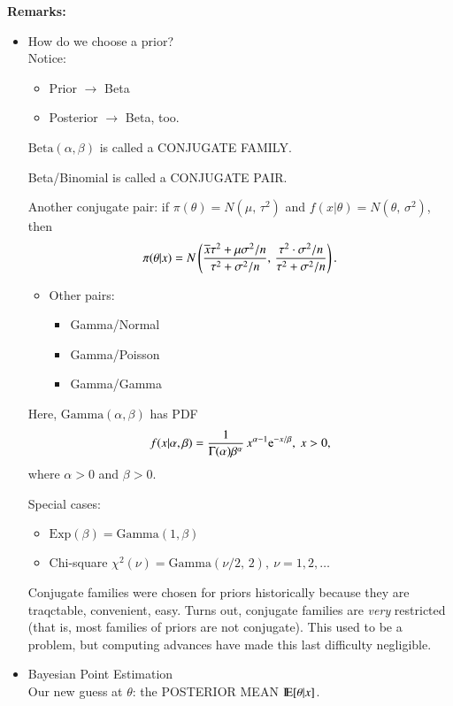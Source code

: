 \documentclass[captions=tableheading]{scrbook}
\begin{document}
\textbf{Remarks:}
\begin{itemize}

\item How do we choose a prior?\\
\label{sec-1_3_2_1}%
Notice:

\begin{itemize}
\item Prior $\to$ Beta
\item Posterior $\to$ Beta, too.
\end{itemize}

\(\mathrm{Beta}(\alpha,\beta)\) is called a CONJUGATE FAMILY.

Beta/Binomial is called a CONJUGATE PAIR.

Another conjugate pair: if \(\pi(\theta) = N(\mu,\,\tau^{2})\) and  \(f(x|\theta) = N(\theta,\,\sigma^{2})\), then
\[
\pi(\theta|x) = N\left(\frac{\overline{x}\tau^{2}+\mu\sigma^{2}/n}{\tau^{2}+\sigma^{2}/n},\,\frac{\tau^{2}\cdot\sigma^{2}/n}{\tau^{2}+\sigma^{2}/n}  \right).
\]


\begin{itemize}
\item Other pairs:
\begin{itemize}
\item Gamma/Normal
\item Gamma/Poisson
\item Gamma/Gamma
\end{itemize}
\end{itemize}

Here, \(\mathrm{Gamma}(\alpha,\beta)\) has PDF
\[
f(x|\alpha,\beta) = \frac{1}{\Gamma(\alpha)\beta^{\alpha}}\,x^{\alpha - 1} \me^{-x/\beta},\ x > 0,
\]
where $\alpha > 0$ and $\beta > 0$.

Special cases:

\begin{itemize}
\item \(\mathrm{Exp}(\beta) = \mathrm{Gamma}(1,\beta)\)
\item Chi-square \(\chi^{2}(\nu) = \mathrm{Gamma}(\nu/2,\,2),\ \nu =1,2,\ldots\)
\end{itemize}

Conjugate families were chosen for priors historically because they are traqctable, convenient, easy.  Turns out, conjugate families are \emph{very} restricted (that is, most families of priors are not conjugate).  This used to be a problem, but computing advances have made this last difficulty negligible.


\item Bayesian Point Estimation\\
\label{sec-1_3_2_2}%
Our new guess at $\theta$:  the POSTERIOR MEAN $\mathrm{I\hspace{-1.5pt}E} [\theta|x]$.


\end{itemize}
\end{document}
